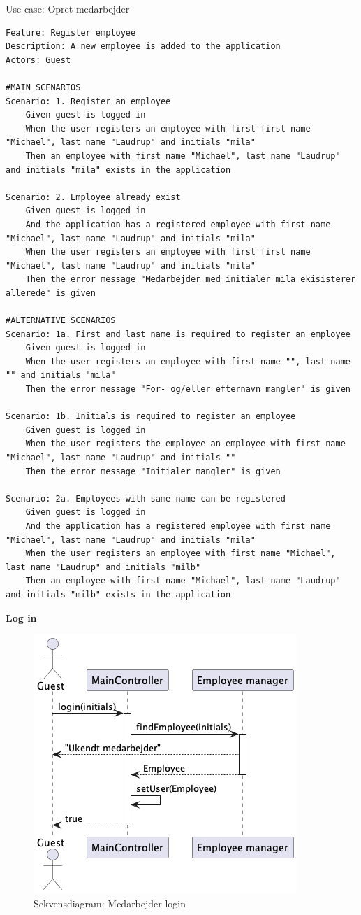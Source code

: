 \begin{listing}[H]
    \centering
    \caption{Use case: Opret medarbejder}\label{lst:usecase_register_employee}
    \begin{verbatim}  
Feature: Register employee
Description: A new employee is added to the application
Actors: Guest

#MAIN SCENARIOS
Scenario: 1. Register an employee
    Given guest is logged in
    When the user registers an employee with first first name "Michael", last name "Laudrup" and initials "mila"
    Then an employee with first name "Michael", last name "Laudrup" and initials "mila" exists in the application

Scenario: 2. Employee already exist
    Given guest is logged in
    And the application has a registered employee with first name "Michael", last name "Laudrup" and initials "mila"
    When the user registers an employee with first first name "Michael", last name "Laudrup" and initials "mila"
    Then the error message "Medarbejder med initialer mila ekisisterer allerede" is given

#ALTERNATIVE SCENARIOS
Scenario: 1a. First and last name is required to register an employee
    Given guest is logged in
    When the user registers an employee with first name "", last name "" and initials "mila"
    Then the error message "For- og/eller efternavn mangler" is given

Scenario: 1b. Initials is required to register an employee
    Given guest is logged in
    When the user registers the employee an employee with first name "Michael", last name "Laudrup" and initials ""
    Then the error message "Initialer mangler" is given

Scenario: 2a. Employees with same name can be registered
    Given guest is logged in
    And the application has a registered employee with first name "Michael", last name "Laudrup" and initials "mila"
    When the user registers an employee with first name "Michael", last name "Laudrup" and initials "milb"
    Then an employee with first name "Michael", last name "Laudrup" and initials "milb" exists in the application
    \end{verbatim}
\end{listing}
\textbf{Log in}
\begin{figure}[H]
    \centering
    \caption{Sekvensdiagram: Medarbejder login}\label{fig:sequence_login}
    \includegraphics[width = .45\textwidth]{Diagrams/seq_login.png}
\end{figure}
